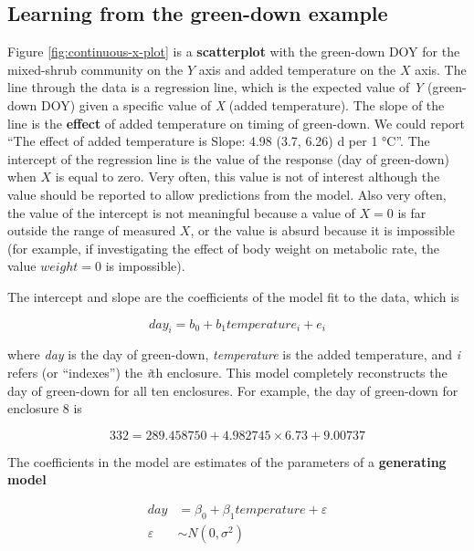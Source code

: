 \documentclass[]{book}
\begin{document}
\hypertarget{learning-from-the-green-down-example}{%
\subsection{Learning from the green-down example}\label{learning-from-the-green-down-example}}

Figure \ref{fig:continuous-x-plot} is a \textbf{scatterplot} with the green-down DOY for the mixed-shrub community on the \(Y\) axis and added temperature on the \(X\) axis. The line through the data is a regression line, which is the expected value of \emph{Y} (green-down DOY) given a specific value of \emph{X} (added temperature). The slope of the line is the \textbf{effect} of added temperature on timing of green-down. We could report ``The effect of added temperature is Slope: 4.98 (3.7, 6.26) d per 1 °C''. The intercept of the regression line is the value of the response (day of green-down) when \(X\) is equal to zero. Very often, this value is not of interest although the value should be reported to allow predictions from the model. Also very often, the value of the intercept is not meaningful because a value of \(X = 0\) is far outside the range of measured \(X\), or the value is absurd because it is impossible (for example, if investigating the effect of body weight on metabolic rate, the value \(weight = 0\) is impossible).

The intercept and slope are the coefficients of the model fit to the data, which is

\begin{equation}
day_i = b_0 + b_1 temperature_i + e_i
\label{eq:continuous-x-fit}
\end{equation}

where \emph{day} is the day of green-down, \emph{temperature} is the added temperature, and \emph{i} refers (or ``indexes'') the \emph{i}th enclosure. This model completely reconstructs the day of green-down for all ten enclosures. For example, the day of green-down for enclosure 8 is

\begin{equation}
332 = 289.458750 + 4.982745 \times 6.73 + 9.00737
\end{equation}

The coefficients in the model are estimates of the parameters of a \textbf{generating model}

\begin{align}
day &= \beta_0 + \beta_1 temperature + \varepsilon\\
\varepsilon &\sim N(0, \sigma^2)
\label{eq:continuous-x-m1}
\end{align}
\end{document}
